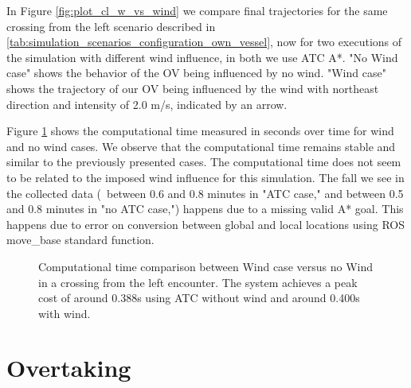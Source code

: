         In Figure \ref{fig:plot_cl_w_vs_wind} we compare final trajectories for the same crossing from the left scenario described in \ref{tab:simulation_scenarios_configuration_own_vessel}, now for two executions of the simulation with different wind influence, in both we use \ac{ATC} A*. "No Wind case" shows the behavior of the \ac{OV} being influenced by no wind. "Wind case" shows the trajectory of our \ac{OV} being influenced by the wind with northeast direction and intensity of 2.0 m/s, indicated by an arrow.
        
        Figure \ref{fig:plot_cl_w_vs_wind_CT} shows the computational time measured in seconds over time for wind and no wind cases. We observe that the computational time remains stable and similar to the previously presented cases. The computational time does not seem to be related to the imposed wind influence for this simulation. The fall we see in the collected data (\eg{}~between 0.6 and 0.8 minutes in "ATC case," and between 0.5 and 0.8 minutes in "no ATC case,") happens due to a missing valid A* goal. This happens due to error on conversion between global and local locations using ROS move\_base standard function.
        
        \begin{figure}[H]
            \centering
            
            \caption{Computational time comparison between Wind case versus no Wind in a crossing from the left encounter. The system achieves a peak cost of around 0.388s using \ac{ATC} without wind and around 0.400s with wind.}
            \label{fig:plot_cl_w_vs_wind_CT}
        \end{figure}
        
        \section{Overtaking}
        

